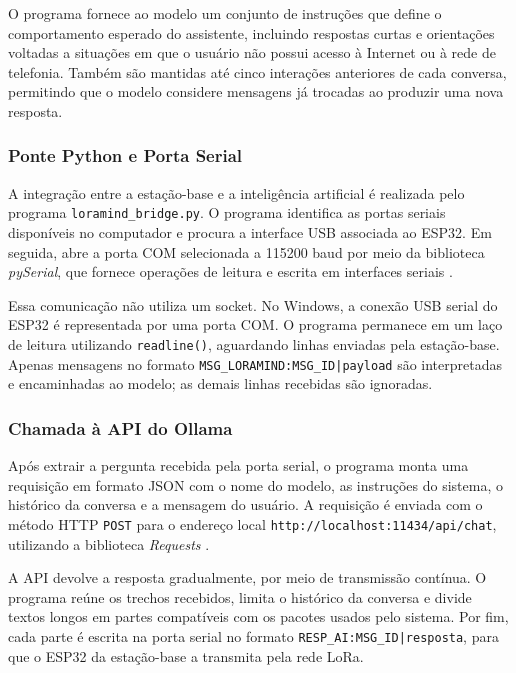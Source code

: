 \documentclass[12pt]{article}
\begin{document}
O programa fornece ao modelo um conjunto de instruções que define o comportamento esperado do assistente, incluindo respostas curtas e orientações voltadas a situações em que o usuário não possui acesso à Internet ou à rede de telefonia. Também são mantidas até cinco interações anteriores de cada conversa, permitindo que o modelo considere mensagens já trocadas ao produzir uma nova resposta.

\subsubsection{Ponte Python e Porta Serial}

A integração entre a estação-base e a inteligência artificial é realizada pelo programa \texttt{loramind\_bridge.py}. O programa identifica as portas seriais disponíveis no computador e procura a interface USB associada ao ESP32. Em seguida, abre a porta COM selecionada a 115200 baud por meio da biblioteca \textit{pySerial}, que fornece operações de leitura e escrita em interfaces seriais \cite{pyserial2026}.

Essa comunicação não utiliza um socket. No Windows, a conexão USB serial do ESP32 é representada por uma porta COM. O programa permanece em um laço de leitura utilizando \texttt{readline()}, aguardando linhas enviadas pela estação-base. Apenas mensagens no formato \texttt{MSG\_LORAMIND:MSG\_ID|payload} são interpretadas e encaminhadas ao modelo; as demais linhas recebidas são ignoradas.

\subsubsection{Chamada à API do Ollama}

Após extrair a pergunta recebida pela porta serial, o programa monta uma requisição em formato JSON com o nome do modelo, as instruções do sistema, o histórico da conversa e a mensagem do usuário. A requisição é enviada com o método HTTP \texttt{POST} para o endereço local \texttt{http://localhost:11434/api/chat}, utilizando a biblioteca \textit{Requests} \cite{ollamaapi2026}.

A API devolve a resposta gradualmente, por meio de transmissão contínua. O programa reúne os trechos recebidos, limita o histórico da conversa e divide textos longos em partes compatíveis com os pacotes usados pelo sistema. Por fim, cada parte é escrita na porta serial no formato \texttt{RESP\_AI:MSG\_ID|resposta}, para que o ESP32 da estação-base a transmita pela rede LoRa.
\end{document}
